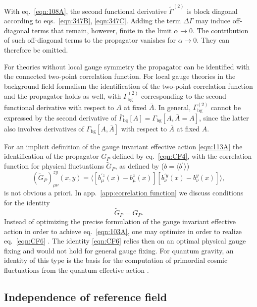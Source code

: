 \documentclass[twocolumn,aps,prd,amsmath,amssymb,preprintnumbers,longbibliography]{revtex4-1}
\numberwithin{equation}{section}
\newcounter{condition}[equation]
\begin{document}
With eq.~\eqref{eqn:108A}, the second functional derivative $\tilde{\Gamma}^{(2)}$ is block diagonal according to eqs.~\eqref{eqn:347B}, \eqref{eqn:347C}. Adding the term $\Delta\Gamma$ may induce off-diagonal terms that remain, however, finite in the limit $\alpha\to 0$. The contribution of such off-diagonal terms to the propagator vanishes for $\alpha\to 0$. They can therefore be omitted. 

For theories without local gauge symmetry the propagator can be identified with the connected two-point correlation function. For local gauge theories in the background field formalism the identification of the two-point correlation function and the propagator holds as well, with $\Gamma_\text{bg}^{(2)}$ corresponding to the second functional derivative with respect to $A$ at fixed $\bar{A}$. In general, $\Gamma_\text{bg}^{(2)}$ cannot be expressed by the second derivative of $\bar\Gamma_\text{bg}[A] = \Gamma_\text{bg}[A,\bar{A} = A]$, since the latter also involves derivatives of $\Gamma_\text{bg}[A,\bar{A}]$ with respect to $\bar{A}$ at fixed $A$.

For an implicit definition of the gauge invariant effective action \eqref{eqn:113A} the identification of the propagator $G_P$ defined by eq.~\eqref{eqn:CF4}, with the correlation function for physical fluctuations $\tilde{G}_P$, as defined by ($b = \langle b^\prime\rangle$)
\begin{equation}\label{eqn:CF5}
	(\tilde{G}_P)_{\mu\nu}^{zy}(x,y)
	= \bigl\langle[b_\mu^{\prime z}(x) - b_\mu^z(x)] [b_\nu^{\prime y}(x) - b_\nu^y(x)]\bigr\rangle,
\end{equation}
is not obvious a priori. In app.~\ref{app:correlation function} we discuss conditions for the identity
\begin{equation}\label{eqn:CF6}
	\tilde{G}_P
	= G_P.
\end{equation}
Instead of optimizing the precise formulation of the gauge invariant effective action in order to achieve eq.~\eqref{eqn:103A}, one may optimize in order to realize eq.~\eqref{eqn:CF6} \cite{CWGIF}. The identity \eqref{eqn:CF6} relies then on an optimal physical gauge fixing and would not hold for general gauge fixing. For quantum gravity, an identity of this type is the basis for the computation of primordial cosmic fluctuations from the quantum effective action \cite{CWPF1,CWPF2}.


\subsection{Independence of reference field}
\end{document}
